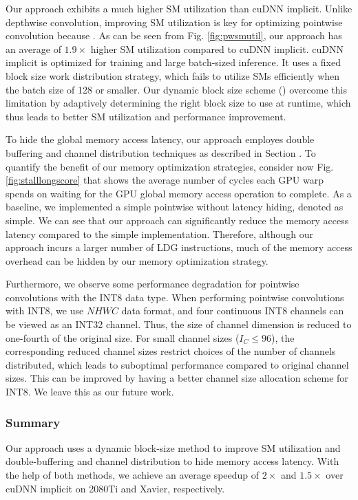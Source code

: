Our approach exhibits a much higher SM utilization than cuDNN implicit. Unlike depthwise convolution, improving SM utilization is key for
optimizing pointwise convolution because .	As can be seen from Fig. \ref{fig:pwsmutil}, our approach has an average of
$1.9\times$ higher SM utilization compared to cuDNN implicit. cuDNN implicit is optimized for training and large batch-sized inference. It
uses a fixed block size work distribution strategy, which fails to utilize SMs efficiently when the batch size of 128 or smaller. Our
dynamic block size scheme () overcome this limitation by adaptively determining the right block size to use at
runtime, which thus leads to better SM utilization and performance improvement.

To hide the global memory access latency, our approach employes double buffering and channel distribution techniques as described in
Section \FIXME{\ref{}}. To quantify the benefit of our memory optimization strategies, consider now  Fig. \ref{fig:stalllongscore} that
shows the average number of cycles each GPU warp spends on waiting for the GPU global memory access operation to complete. As a baseline,
we implemented a simple pointwise without latency hiding, denoted as simple. We can see that our approach can significantly reduce the
memory access latency compared to the simple implementation. Therefore, although our approach incurs a larger number of LDG instructions,
much of the memory access overhead can be hidden by our memory optimization strategy.



Furthermore, we observe some performance degradation for pointwise convolutions with the INT8 data type. When performing pointwise
convolutions with INT8, we use $NHWC$ data format, and four continuous INT8 channels can be viewed as an INT32 channel. Thus, the size of
channel dimension is reduced to one-fourth of the original size. For small channel sizes ($I_C \leq 96$), the corresponding reduced channel
sizes restrict choices of the number of channels distributed, which leads to suboptimal performance compared to original channel sizes.
This can be improved by having a better channel size allocation scheme for INT8. We leave this as our future work.

\subsubsection{Summary} Our approach uses a dynamic block-size method to improve SM utilization and double-buffering and channel distribution to hide
memory access latency. With the help of both methods, we achieve an average speedup of $2\times$ and $1.5\times$ over cuDNN implicit on
2080Ti and Xavier, respectively.






